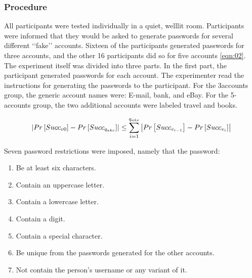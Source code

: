 \documentclass[fleqn]{Paquetes/RevDigMatEduInt}
\begin{document}
\subsubsection{Procedure}
All participants were tested individually in a quiet, welllit room. Participants were informed that they would be asked to generate passwords for several different ‘‘fake’’ accounts. Sixteen of the participants generated passwords for three accounts, and the other 16 participants did so for five accounts \ref{eqn:02}. The experiment itself was divided into three parts. In the first part, the participant generated passwords for each account. The experimenter read the instructions for generating the passwords to the participant. For the 3accounts group, the generic account names were: E-mail, bank, and eBay. For the 5-accounts group, the two additional accounts were labeled travel and books.

\begin{equation}
    \centering
	\left|Pr\left[Succ_{v0}\right] - Pr\left[Succ_{q_{akc}}\right]\right| \le \sum_{i = 1}^{q_{ake}} \left|Pr\left[Succ_{v_{i-1}}\right] - Pr\left[Succ_{v_{i}}\right]\right|
	\label{eqn:02}
\end{equation}

Seven password restrictions were imposed, namely that the password:
\begin{enumerate}
\item Be at least six characters.
\item Contain an uppercase letter.
\item Contain a lowercase letter.
\item Contain a digit.
\item Contain a special character.
\item Be unique from the passwords generated for the other accounts.
\item Not contain the person’s username or any variant of it.
\end{enumerate}
\end{document}
